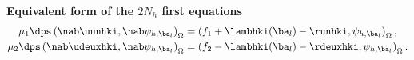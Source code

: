 \documentclass{beamer}
\begin{document}
\begin{frame}
%
\vspace{-0.1 cm}
\textbf{Equivalent form of the $2N_h$ first equations}
\begin{align*}
\nonumber\mu_1\dps \left(\nab \uunhki, \nab \psi_{h,{{\ba}_l}}\right)_{\Omega}&=\left(f_1+\lambhki({{\ba}_l})-\runhki,\psi_{h,\ba_l}\right)_{\Omega},\\
\mu_2 \dps \left(\nab \udeuxhki, \nab \psi_{h,{{\ba}_l}}\right)_{\Omega}&=    \left(f_2-\lambhki({{\ba}_l})-\rdeuxhki, \psi_{h,{\ba}_l}\right)_{\Omega}.
\label{eq:variational:formulation:inexacte_newton}
\end{align*}
\end{frame}
\end{document}
